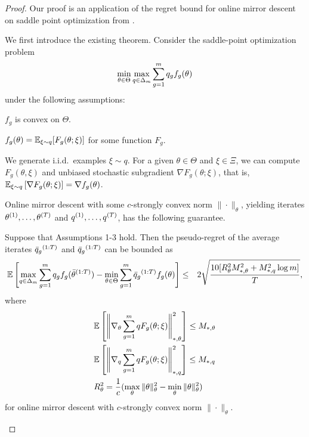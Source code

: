 \begin{proof}
  Our proof is an application of the regret bound for online mirror descent on saddle point optimization from \citet{nemirovski2009robust}.

  We first introduce the existing theorem. Consider the saddle-point optimization problem
  \begin{align}
      \min_{\theta\in\Theta}\max_{q\in\Delta_m} \sum_{g=1}^m q_g f_g(\theta)
  \end{align}
  under the following assumptions:

  \begin{assumption}
     $f_g$ is convex on $\Theta$.
  \end{assumption}

  \begin{assumption}
    $f_g(\theta) = \mathbb{E}_{\xi \sim q}[F_g(\theta; \xi)]$ for some function $F_g$.
  \end{assumption}

  \begin{assumption}
     We generate i.i.d.\ examples $\xi \sim q$. For a given $\theta\in\Theta$ and $\xi \in \Xi$, we can compute $F_g(\theta, \xi)$ and unbiased stochastic subgradient $\nabla F_g(\theta; \xi)$, that is, $\mathbb{E}_{\xi\sim q}\left[\nabla F_g(\theta; \xi)\right] = \nabla f_g(\theta)$.
  \end{assumption}

  Online mirror descent with some $c$-strongly convex norm $\|\cdot\|_\theta$,
  yielding iterates
  $\theta{^{(1)}}, \ldots, \theta{^{(T)}}$ and
  $q{^{(1)}}, \ldots, q{^{(T)}}$,
  has the following guarantee.

  \begin{theorem}\label{thm:nemirovski}
    Suppose that Assumptions 1-3 hold. Then the pseudo-regret of the average iterates $\bar{q}_g{^{(1:T)}}$
    and $\bar{q}_g{^{(1:T)}}$ can be bounded as
    \begin{align}
        &\mathbb{E}\left[\max_{q\in\Delta_m} \sum_{g=1}^m q_g f_g(\bar{\theta}{^{(1:T)}}) - \min_{\theta\in\Theta} \sum_{g=1}^m \bar{q}_g{^{(1:T)}} f_g(\theta) \right]
        \le & 2\sqrt{\frac{10[R_\theta^2M_{*,\theta}^2 + M_{*,q}^2\log m]}{T}},
    \end{align}
    where
    \begin{align}
        &\mathbb{E}\left[\left\|\nabla_\theta \sum_{g=1}^m q F_g(\theta; \xi) \right\|^2_{*,\theta}\right] \le M_{*,\theta}\\
        &\mathbb{E}\left[\left\|\nabla_{q} \sum_{g=1}^m q F_g(\theta; \xi) \right\|^2_{*,q}\right] \le M_{*,q}\\
        & R_\theta^2 = \frac{1}{c}(\max_\theta \|\theta\|^2_\theta - \min_\theta \|\theta\|^2_\theta)
    \end{align}
    for online mirror descent with $c$-strongly convex norm $\|\cdot\|_\theta$.
  \end{theorem}


\end{proof}
